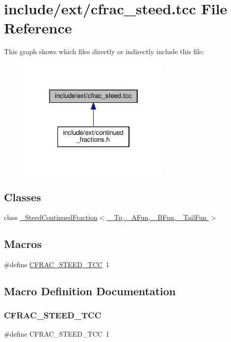 \hypertarget{cfrac__steed_8tcc}{}\section{include/ext/cfrac\+\_\+steed.tcc File Reference}
\label{cfrac__steed_8tcc}
This graph shows which files directly or indirectly include this file\+:
\nopagebreak
\begin{figure}[H]
\begin{center}
\leavevmode
\includegraphics[width=214pt]{cfrac__steed_8tcc__dep__incl}
\end{center}
\end{figure}
\subsection*{Classes}
\begin{DoxyCompactItemize}
\item 
class \hyperlink{class__SteedContinuedFraction}{\+\_\+\+Steed\+Continued\+Fraction$<$ \+\_\+\+Tp, \+\_\+\+A\+Fun, \+\_\+\+B\+Fun, \+\_\+\+Tail\+Fun $>$}
\end{DoxyCompactItemize}
\subsection*{Macros}
\begin{DoxyCompactItemize}
\item 
\#define \hyperlink{cfrac__steed_8tcc_abc8003fbf1259def07f4af43fd210d99}{C\+F\+R\+A\+C\+\_\+\+S\+T\+E\+E\+D\+\_\+\+T\+CC}~1
\end{DoxyCompactItemize}


\subsection{Macro Definition Documentation}
\mbox{\label{cfrac__steed_8tcc_abc8003fbf1259def07f4af43fd210d99}} 
\subsubsection{\texorpdfstring{C\+F\+R\+A\+C\+\_\+\+S\+T\+E\+E\+D\+\_\+\+T\+CC}{CFRAC\_STEED\_TCC}}
{\footnotesize\ttfamily \#define C\+F\+R\+A\+C\+\_\+\+S\+T\+E\+E\+D\+\_\+\+T\+CC~1}

